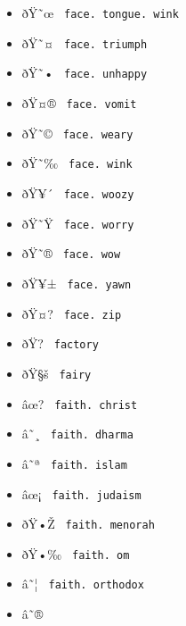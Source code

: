 \begin{itemize}
\item
  \label{symbol-face.tongue.wink}{{ ðŸ˜œ }
  \texttt{\ face.\ tongue.\ wink\ }}
\item
  \label{symbol-face.triumph}{{ ðŸ˜¤ }
  \texttt{\ face.\ triumph\ }}
\item
  \label{symbol-face.unhappy}{{ ðŸ˜• }
  \texttt{\ face.\ unhappy\ }}
\item
  \label{symbol-face.vomit}{{ ðŸ¤® }
  \texttt{\ face.\ vomit\ }}
\item
  \label{symbol-face.weary}{{ ðŸ˜© }
  \texttt{\ face.\ weary\ }}
\item
  \label{symbol-face.wink}{{ ðŸ˜‰ }
  \texttt{\ face.\ wink\ }}
\item
  \label{symbol-face.woozy}{{ ðŸ¥´ }
  \texttt{\ face.\ woozy\ }}
\item
  \label{symbol-face.worry}{{ ðŸ˜Ÿ }
  \texttt{\ face.\ worry\ }}
\item
  \label{symbol-face.wow}{{ ðŸ˜® }
  \texttt{\ face.\ wow\ }}
\item
  \label{symbol-face.yawn}{{ ðŸ¥± }
  \texttt{\ face.\ yawn\ }}
\item
  \label{symbol-face.zip}{{ ðŸ¤? }
  \texttt{\ face.\ zip\ }}
\item
  \label{symbol-factory}{{ ðŸ?­ } \texttt{\ factory\ }}
\item
  \label{symbol-fairy}{{ ðŸ§š } \texttt{\ fairy\ }}
\item
  \label{symbol-faith.christ}{{ âœ? }
  \texttt{\ faith.\ christ\ }}
\item
  \label{symbol-faith.dharma}{{ â˜¸ }
  \texttt{\ faith.\ dharma\ }}
\item
  \label{symbol-faith.islam}{{ â˜ª }
  \texttt{\ faith.\ islam\ }}
\item
  \label{symbol-faith.judaism}{{ âœ¡ }
  \texttt{\ faith.\ judaism\ }}
\item
  \label{symbol-faith.menorah}{{ ðŸ•Ž }
  \texttt{\ faith.\ menorah\ }}
\item
  \label{symbol-faith.om}{{ ðŸ•‰ }
  \texttt{\ faith.\ om\ }}
\item
  \label{symbol-faith.orthodox}{{ â˜¦ }
  \texttt{\ faith.\ orthodox\ }}
\item
  \label{symbol-faith.peace}{{ â˜® }
}
\end{itemize}
